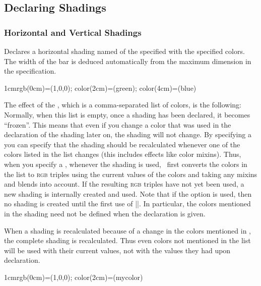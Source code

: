 \subsection{Declaring Shadings}

\subsubsection{Horizontal and Vertical Shadings}

\begin{command}{\pgfdeclarehorizontalshading{}}
    Declares a horizontal shading named  of the specified
     with the specified colors. The width of the bar is deduced
    automatically from the maximum dimension in the specification.
\begin{codeexample}[]
  {1cm}{rgb(0cm)=(1,0,0); color(2cm)=(green); color(4cm)=(blue)}
\end{codeexample}

    The effect of the , which is a comma-separated list of
    colors, is the following: Normally, when this list is empty, once a shading
    has been declared, it becomes ``frozen''. This means that even if you
    change a color that was used in the declaration of the shading later on,
    the shading will not change. By specifying a  you can
    specify that the shading should be recalculated whenever one of the colors
    listed in the list changes (this includes effects like color mixins). Thus,
    when you specify a , whenever the shading is used,
    \pgfname\ first converts the colors in the list to \textsc{rgb} triples
    using the current values of the colors and taking any mixins and blends
    into account. If the resulting \textsc{rgb} triples have not yet been used,
    a new shading is internally created and used. Note that if the option
     is used, then no shading is created until the first use
    of |\pgfuseshading|. In particular, the colors mentioned in the shading
    need not be defined when the declaration is given.

    When a shading is recalculated because of a change in the colors mentioned
    in , the complete shading is recalculated. Thus even
    colors not mentioned in the list will be used with their current values,
    not with the values they had upon declaration.
\begin{codeexample}[]
  {1cm}{rgb(0cm)=(1,0,0); color(2cm)=(mycolor)}
\end{codeexample}
\end{command}

